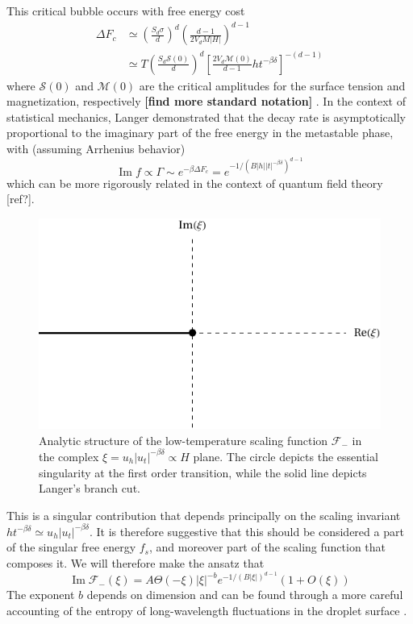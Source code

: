 \documentclass[
  aps,
  pre,
  reprint,
  longbibliography,
  floatfix
]{revtex4-2}
\begin{document}
This critical bubble occurs with free energy cost
\begin{equation}
  \begin{aligned}
    \Delta F_c
      &\simeq\left(\frac{S_d\sigma}d\right)^d\left(\frac{d-1}{2V_dM|H|}\right)^{d-1} \\
      &\simeq T\left(\frac{S_d\mathcal S(0)}d\right)^d\left[\frac{2V_d\mathcal M(0)}{d-1}ht^{-\beta\delta}\right]^{-(d-1)}
  \end{aligned}
\end{equation}
where $\mathcal S(0)$ and $\mathcal M(0)$ are the critical amplitudes for the
surface tension and magnetization, respectively \textbf{[find more standard
notation]} \cite{Kent-Dobias_2020_Novel}.
In the context of statistical mechanics, Langer demonstrated that the decay rate is asymptotically proportional to the imaginary part of the free energy in the metastable phase, with (assuming Arrhenius behavior)
\begin{equation}
  \operatorname{Im}f\propto\Gamma\sim e^{-\beta\Delta F_c}=e^{-1/(B|h||t|^{-\beta\delta})^{d-1}}
\end{equation}
which can be more rigorously related in the context of quantum field theory [ref?].

\begin{figure}
  \includegraphics{figs/F_lower_singularities.pdf}
  \caption{
    Analytic structure of the low-temperature scaling function $\mathcal F_-$
    in the complex $\xi=u_h|u_t|^{-\beta\delta}\propto H$ plane. The circle
    depicts the essential singularity at the first order transition, while the
    solid line depicts Langer's branch cut.
  } \label{fig:lower.singularities}
\end{figure}
  
This is a singular contribution that depends principally on the scaling
invariant $ht^{-\beta\delta}\simeq u_h|u_t|^{-\beta\delta}$. It is therefore
suggestive that this should be considered a part of the singular free energy
$f_s$, and moreover part of the scaling function that composes it. We will therefore make the ansatz that
\begin{equation}
  \operatorname{Im}\mathcal F_-(\xi)=A\Theta(-\xi)|\xi|^{-b}e^{-1/(B|\xi|)^{d-1}}\left(1+O(\xi)\right)
\end{equation}
\cite{Houghton_1980_The}
The exponent $b$ depends on dimension and can be found through a more careful
accounting of the entropy of long-wavelength fluctuations in the droplet
surface \cite{Gunther_1980_Goldstone}.
\end{document}
